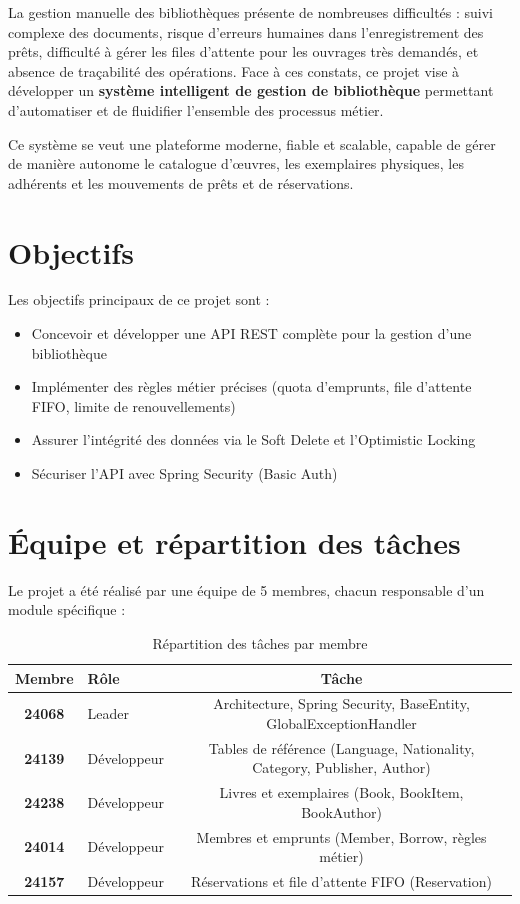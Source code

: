 \documentclass[12pt,a4paper,twoside]{report}
\begin{document}
La gestion manuelle des bibliothèques présente de nombreuses difficultés : suivi complexe des documents, risque d'erreurs humaines dans l'enregistrement des prêts, difficulté à gérer les files d'attente pour les ouvrages très demandés, et absence de traçabilité des opérations. Face à ces constats, ce projet vise à développer un \textbf{système intelligent de gestion de bibliothèque} permettant d'automatiser et de fluidifier l'ensemble des processus métier.

Ce système se veut une plateforme moderne, fiable et scalable, capable de gérer de manière autonome le catalogue d'œuvres, les exemplaires physiques, les adhérents et les mouvements de prêts et de réservations.

\section{Objectifs}

Les objectifs principaux de ce projet sont :

\begin{itemize}
    \item Concevoir et développer une API REST complète pour la gestion d'une bibliothèque
    \item Implémenter des règles métier précises (quota d'emprunts, file d'attente FIFO, limite de renouvellements)
    \item Assurer l'intégrité des données via le Soft Delete et l'Optimistic Locking
    \item Sécuriser l'API avec Spring Security (Basic Auth)
\end{itemize}

\section{Équipe et répartition des tâches}

Le projet a été réalisé par une équipe de 5 membres, chacun responsable d'un module spécifique :

\begin{table}[H]
\centering
\caption{Répartition des tâches par membre}
\label{tab:equipe}
\begin{tabularx}{\textwidth}{c X c}
\hline
\rowcolor[gray]{0.9}
\textbf{Membre} & \textbf{Rôle} & \textbf{Tâche} \\
\hline
\textbf{24068} & Leader & Architecture, Spring Security, BaseEntity, GlobalExceptionHandler \\
\textbf{24139} & Développeur & Tables de référence (Language, Nationality, Category, Publisher, Author) \\
\textbf{24238} & Développeur & Livres et exemplaires (Book, BookItem, BookAuthor) \\
\textbf{24014} & Développeur & Membres et emprunts (Member, Borrow, règles métier) \\
\textbf{24157} & Développeur & Réservations et file d'attente FIFO (Reservation) \\
\hline
\end{tabularx}
\end{table}
\end{document}
